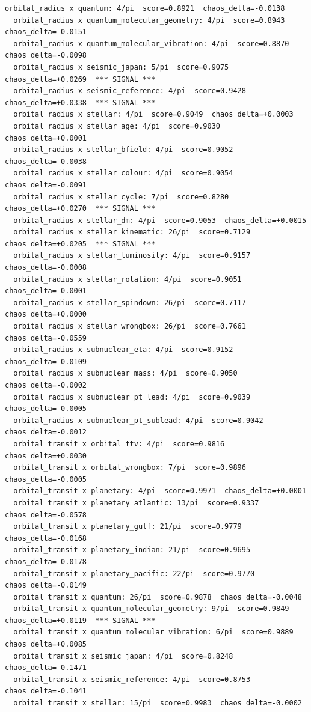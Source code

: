\documentclass[11pt, letterpaper, openany]{book}
\begin{document}
\begin{empiricalbox}
\begin{lstlisting}[style=terminal]
  orbital_radius x quantum: 4/pi  score=0.8921  chaos_delta=-0.0138
  orbital_radius x quantum_molecular_geometry: 4/pi  score=0.8943  chaos_delta=-0.0151
  orbital_radius x quantum_molecular_vibration: 4/pi  score=0.8870  chaos_delta=-0.0098
  orbital_radius x seismic_japan: 5/pi  score=0.9075  chaos_delta=+0.0269  *** SIGNAL ***
  orbital_radius x seismic_reference: 4/pi  score=0.9428  chaos_delta=+0.0338  *** SIGNAL ***
  orbital_radius x stellar: 4/pi  score=0.9049  chaos_delta=+0.0003
  orbital_radius x stellar_age: 4/pi  score=0.9030  chaos_delta=+0.0001
  orbital_radius x stellar_bfield: 4/pi  score=0.9052  chaos_delta=-0.0038
  orbital_radius x stellar_colour: 4/pi  score=0.9054  chaos_delta=-0.0091
  orbital_radius x stellar_cycle: 7/pi  score=0.8280  chaos_delta=+0.0270  *** SIGNAL ***
  orbital_radius x stellar_dm: 4/pi  score=0.9053  chaos_delta=+0.0015
  orbital_radius x stellar_kinematic: 26/pi  score=0.7129  chaos_delta=+0.0205  *** SIGNAL ***
  orbital_radius x stellar_luminosity: 4/pi  score=0.9157  chaos_delta=-0.0008
  orbital_radius x stellar_rotation: 4/pi  score=0.9051  chaos_delta=-0.0001
  orbital_radius x stellar_spindown: 26/pi  score=0.7117  chaos_delta=+0.0000
  orbital_radius x stellar_wrongbox: 26/pi  score=0.7661  chaos_delta=-0.0559
  orbital_radius x subnuclear_eta: 4/pi  score=0.9152  chaos_delta=-0.0109
  orbital_radius x subnuclear_mass: 4/pi  score=0.9050  chaos_delta=-0.0002
  orbital_radius x subnuclear_pt_lead: 4/pi  score=0.9039  chaos_delta=-0.0005
  orbital_radius x subnuclear_pt_sublead: 4/pi  score=0.9042  chaos_delta=-0.0012
  orbital_transit x orbital_ttv: 4/pi  score=0.9816  chaos_delta=+0.0030
  orbital_transit x orbital_wrongbox: 7/pi  score=0.9896  chaos_delta=-0.0005
  orbital_transit x planetary: 4/pi  score=0.9971  chaos_delta=+0.0001
  orbital_transit x planetary_atlantic: 13/pi  score=0.9337  chaos_delta=-0.0578
  orbital_transit x planetary_gulf: 21/pi  score=0.9779  chaos_delta=-0.0168
  orbital_transit x planetary_indian: 21/pi  score=0.9695  chaos_delta=-0.0178
  orbital_transit x planetary_pacific: 22/pi  score=0.9770  chaos_delta=-0.0149
  orbital_transit x quantum: 26/pi  score=0.9878  chaos_delta=-0.0048
  orbital_transit x quantum_molecular_geometry: 9/pi  score=0.9849  chaos_delta=+0.0119  *** SIGNAL ***
  orbital_transit x quantum_molecular_vibration: 6/pi  score=0.9889  chaos_delta=+0.0085
  orbital_transit x seismic_japan: 4/pi  score=0.8248  chaos_delta=-0.1471
  orbital_transit x seismic_reference: 4/pi  score=0.8753  chaos_delta=-0.1041
  orbital_transit x stellar: 15/pi  score=0.9983  chaos_delta=-0.0002

\end{lstlisting}
\end{empiricalbox}
\end{document}
